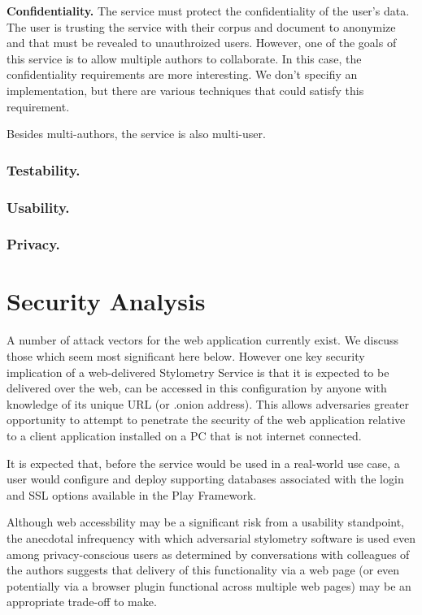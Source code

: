 \documentclass[letterpaper]{article}
\begin{document}
{\bf Confidentiality.} The service must protect the confidentiality of
the user's data.  The user is trusting the service with their corpus
and document to anonymize and that must be revealed to unauthroized
users.  However, one of the goals of this service is to allow multiple
authors to collaborate.  In this case, the confidentiality
requirements are more interesting.  We don't specifiy an
implementation, but there are various techniques that could satisfy
this requirement.

Besides multi-authors, the service is also multi-user.

\subsubsection{Testability.}


\subsubsection{Usability.}

\subsubsection{Privacy.}


\section{Security Analysis}

A number of attack vectors for the web application currently exist. We
discuss those which seem most significant here below. However one key
security implication of a web-delivered Stylometry Service is that it
is expected to be delivered over the web, can be accessed in this
configuration by anyone with knowledge of its unique URL (or .onion
address). This allows adversaries greater opportunity to attempt to
penetrate the security of the web application relative to a client
application installed on a PC that is not internet connected.

It is expected that, before the service would be used in a real-world
use case, a user would configure and deploy supporting databases
associated with the login and SSL options available in the
Play Framework.

Although web accessbility may be a significant risk from a usability
standpoint, the anecdotal infrequency with which adversarial
stylometry software is used even among privacy-conscious users as
determined by conversations with colleagues of the authors
suggests that delivery of this functionality via a web page (or even
potentially via a browser plugin functional across multiple web pages)
may be an appropriate trade-off to make.
\end{document}
